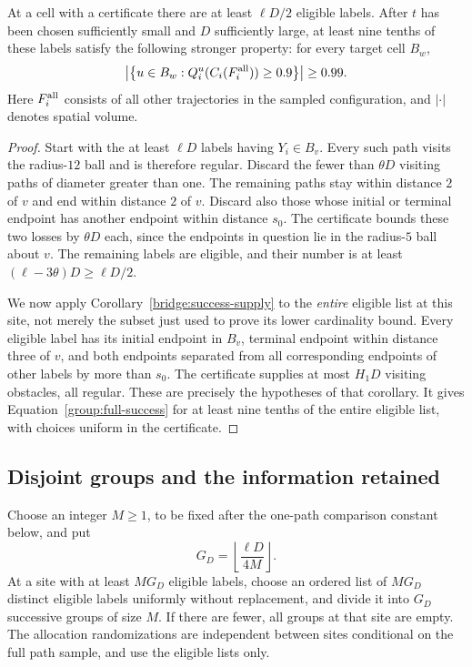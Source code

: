\begin{lemma}\label{group:certified-labels}
At a cell with a certificate there are at least $\ell D/2$ eligible
labels.  After $t$ has been chosen sufficiently small and $D$ sufficiently
large, at least nine tenths of these labels satisfy the following
stronger property: for every target cell $B_w$,
\begin{equation}\label{group:full-success}
 \left|\left\{u\in B_w:
 Q_i^u(C_i(F_i^{\rm all}))\ge0.9\right\}\right|\ge0.99.
\end{equation}
Here $F_i^{\rm all}$ consists of all other trajectories in the sampled
configuration, and $|\cdot|$ denotes spatial volume.
\end{lemma}

\begin{proof}
Start with the at least $\ell D$ labels having $Y_i\in B_v$.
Every such path visits the radius-$12$ ball and is therefore regular.
Discard the fewer than $\theta D$ visiting paths of diameter greater
than one.  The remaining paths stay within distance $2$ of $v$ and
end within distance $2$ of $v$.  Discard also those whose initial or
terminal endpoint has another endpoint within distance $s_0$.
The certificate bounds these two losses by $\theta D$ each, since
the endpoints in question lie in the radius-$5$ ball about $v$.
The remaining labels are eligible, and their number is at least
$(\ell-3\theta)D\ge\ell D/2$.

We now apply Corollary~\ref{bridge:success-supply} to the
\emph{entire} eligible list at this site, not merely the subset just
used to prove its lower cardinality bound.  Every eligible label has
its initial endpoint in $B_v$, terminal endpoint within distance
three of $v$, and both endpoints separated from all corresponding
endpoints of other labels by more than $s_0$.  The certificate supplies
at most $H_1D$ visiting obstacles, all regular.  These are precisely
the hypotheses of that corollary.  It gives
Equation~\eqref{group:full-success} for at least nine tenths of the
entire eligible list, with choices uniform in the certificate.
\end{proof}

\subsection{Disjoint groups and the information retained}

Choose an integer $M\ge1$, to be fixed after the one-path comparison
constant below, and put
\begin{equation}\label{group:number}
 G_D=\left\lfloor\frac{\ell D}{4M}\right\rfloor.
\end{equation}
At a site with at least $MG_D$ eligible labels, choose an ordered list
of $MG_D$ distinct eligible labels uniformly without replacement,
and divide it into $G_D$ successive groups of size $M$.
If there are fewer, all groups at that site are empty.  The allocation
randomizations are independent between sites conditional on the full
path sample, and use the eligible lists only.

